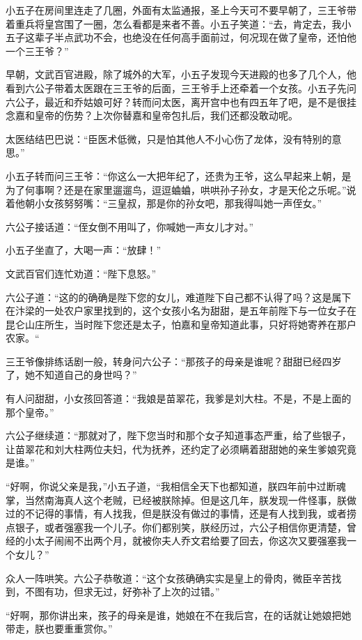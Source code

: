 小五子在房间里连走了几圈，外面有太监通报，圣上今天可不要早朝了，三王爷带着重兵将皇宫围了一圈，怎么看都是来者不善。小五子笑道：“去，肯定去，我小五子这辈子半点武功不会，也绝没在任何高手面前过，何况现在做了皇帝，还怕他一个三王爷？”
\newline

早朝，文武百官进殿，除了城外的大军，小五子发现今天进殿的也多了几个人，他看到六公子带着太医跟在三王爷的后面，三王爷手上还牵着一个女孩。小五子先问六公子，最近和乔姑娘可好？转而问太医，离开宫中也有四五年了吧，是不是很挂念嘉和皇帝的伤势？上次你替嘉和皇帝包扎后，我们还都没敢动呢。

太医结结巴巴说：“臣医术低微，只是怕其他人不小心伤了龙体，没有特别的意思。”

小五子转而问三王爷：“你这么一大把年纪了，还贵为王爷，这么早起来上朝，是为了何事啊？还是在家里遛遛鸟，逗逗蛐蛐，哄哄孙子孙女，才是天伦之乐呢。”说着他朝小女孩努努嘴：“三皇叔，那是你的孙女吧，那我得叫她一声侄女。”

六公子接话道：“侄女倒不用叫了，你喊她一声女儿才对。”

小五子坐直了，大喝一声：“放肆！”

文武百官们连忙劝道：“陛下息怒。”

六公子道：“这的的确确是陛下您的女儿，难道陛下自己都不认得了吗？这是属下在汴梁的一处农户家里找到的，这个女孩小名为甜甜，是五年前陛下与一位女子在昆仑山庄所生，当时陛下您还是太子，怕嘉和皇帝知道此事，只好将她寄养在那户农家。“

三王爷像排练话剧一般，转身问六公子：“那孩子的母亲是谁呢？甜甜已经四岁了，她不知道自己的身世吗？”

有人问甜甜，小女孩回答道：“我娘是苗翠花，我爹是刘大柱。不是，不是上面的那个皇帝。”

六公子继续道：“那就对了，陛下您当时和那个女子知道事态严重，给了些银子，让苗翠花和刘大柱两位夫妇，代为抚养，还约定了必须瞒着甜甜她的亲生爹娘究竟是谁。”

“好啊，你说父亲是我，”小五子道，“我相信全天下也都知道，朕四年前中过断魂掌，当然南海真人这个老贼，已经被朕除掉。但是这几年，朕发现一件怪事，朕做过的不记得的事情，有人找我，但是朕没有做过的事情，还是有人找到我，或者捞点银子，或者强塞我一个儿子。你们都别笑，朕经历过，六公子相信你更清楚，曾经的小太子闹闹不出两个月，就被你夫人乔文君给要了回去，你这次又要强塞我一个女儿？”

众人一阵哄笑。六公子恭敬道：“这个女孩确确实实是皇上的骨肉，微臣辛苦找到，不图有功，但求无过，好弥补了上次的过错。”

“好啊，那你讲出来，孩子的母亲是谁，她娘在不在我后宫，在的话就让她娘把她带走，朕也要重重赏你。”

